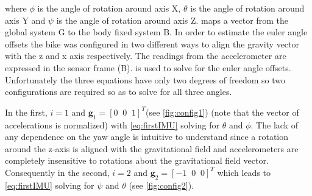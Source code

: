 where \ensuremath{\phi} is the angle of rotation around axis X, \ensuremath{\theta} is the angle of rotation around axis Y and \ensuremath{\psi} is the angle of rotation around axis Z.  maps a vector from the global system G to the body fixed system B. In order to estimate the euler angle offsets the bike was configured in two different ways to align the gravity vector with the z and x axis respectively.
The readings from the accelerometer are expressed in the sensor frame (B).   is used to solve for the euler angle offsets. Unfortunately the three equations have only two degrees of freedom so two configurations are required so as to solve for all three angles. 

 In the first, \ensuremath{i=1} and \ensuremath{\boldsymbol{g}_1=[ 0 \;\; 0 \;\; 1]^T }(see \cref{fig:config1}) (note that the vector of accelerations is normalized)  with \cref{eq:firstIMU} solving for \ensuremath{\theta} and \ensuremath{\phi}. The lack of any dependence on the yaw  angle is intuitive to understand since a rotation  around the z-axis is aligned with the gravitational field and accelerometers are completely insensitive to rotations about the gravitational field vector. Consequently in the second, \ensuremath{i=2} and \ensuremath{\boldsymbol{g}_2=[ -1 \;\;0\;\; 0 ]^T} which leads to   \cref{eq:firstIMU} solving for \ensuremath{\psi} and \ensuremath{\theta} (see \cref{fig:config2}).
 
